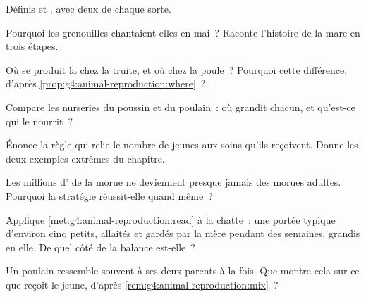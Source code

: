 \begin{exercise}[$\star$]\label{exo:g4:animal-reproduction:2}
Définis  et , avec deux  de chaque sorte.
\end{exercise}

\begin{exercise}[$\star$]\label{exo:g4:animal-reproduction:3}
Pourquoi les grenouilles chantaient-elles en mai~? Raconte
l'histoire de la mare en trois étapes.
\end{exercise}

\begin{exercise}[$\star$]\label{exo:g4:animal-reproduction:4}
Où se produit la  chez la truite, et où chez la poule~?
Pourquoi cette différence, d'après
\cref{prop:g4:animal-reproduction:where}~?
\end{exercise}

\begin{exercise}[$\star$]\label{exo:g4:animal-reproduction:5}
Compare les nurseries du poussin et du poulain~: où grandit chacun,
et qu'est-ce qui le nourrit~?
\end{exercise}

\begin{exercise}[$\star$]\label{exo:g4:animal-reproduction:6}
Énonce la règle qui relie le nombre de jeunes aux soins qu'ils
reçoivent. Donne les deux exemples extrêmes du chapitre.
\end{exercise}

\begin{exercise}[$\star$]\label{exo:g4:animal-reproduction:7}
Les millions d' de la morue ne deviennent presque jamais des
morues adultes. Pourquoi la stratégie réussit-elle quand même~?
\end{exercise}

\begin{exercise}[$\star$]\label{exo:g4:animal-reproduction:8}
Applique \cref{met:g4:animal-reproduction:read} à la chatte~: une
portée typique d'environ cinq petits, allaités et gardés par la mère
pendant des semaines, grandis en elle. De quel côté de la balance
est-elle~?
\end{exercise}

\begin{exercise}[$\star\star$]\label{exo:g4:animal-reproduction:9}
Un poulain ressemble souvent à ses deux parents à la fois. Que
montre cela sur ce que reçoit le jeune, d'après
\cref{rem:g4:animal-reproduction:mix}~?
\end{exercise}

